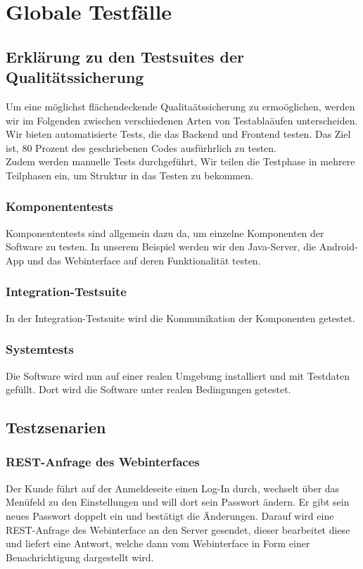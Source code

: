 \chapter{Globale Testf\"alle}
\section{Erkl\"arung zu den Testsuites der Qualit\"atssicherung}
Um eine m\"oglichst fl\"achendeckende Qualita\"atssicherung zu ermo\"oglichen, werden wir im Folgenden zwischen verschiedenen Arten von Testabla\"aufen unterscheiden. Wir bieten automatisierte Tests, die das Backend und Frontend testen. Das Ziel ist, 80 Prozent des geschriebenen Codes ausf\"urhrlich zu testen. \\
Zudem werden manuelle Tests durchgef\"uhrt, 
Wir teilen die Testphase in mehrere Teilphasen ein, um Struktur in das Testen zu bekommen.
\subsection{Komponententests}
Komponententests sind allgemein dazu da, um einzelne Komponenten der Software zu testen. In unserem Beispiel werden wir den Java-Server, die Android-App und das Webinterface auf deren Funktionalit\"at testen. 
\subsection{Integration-Testsuite}
In der Integration-Testsuite wird die Kommunikation der Komponenten getestet.
\subsection{Systemtests}
Die Software wird nun auf einer realen Umgebung installiert und mit Testdaten gef\"ullt. Dort wird die Software unter realen Bedingungen getestet.

\section{Testzsenarien}
\subsection{REST-Anfrage des Webinterfaces}
Der Kunde f\"uhrt auf der Anmeldeseite einen Log-In durch, wechselt \"uber das Men\"ufeld zu den Einstellungen und will dort sein Passwort \"andern. Er gibt sein neues Passwort doppelt ein und best\"atigt die \"Anderungen. Darauf wird eine REST-Anfrage des Webinterface an den Server gesendet, dieser bearbeitet diese und liefert eine Antwort, welche dann vom Webinterface in Form einer Benachrichtigung dargestellt wird.

